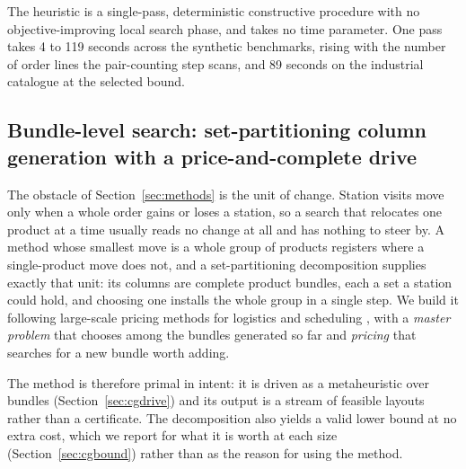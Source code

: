 \documentclass[]{interact}
\begin{document}
The heuristic is a single-pass, deterministic constructive procedure with no objective-improving local search phase, and takes no time parameter. One pass takes 4 to 119 seconds across the synthetic benchmarks, rising with the number of order lines the pair-counting step scans, and 89 seconds on the industrial catalogue at the selected bound.


\subsection{Bundle-level search: set-partitioning column generation with a price-and-complete drive}\label{sec:cg}
The obstacle of Section~\ref{sec:methods} is the unit of change. Station visits move only when a whole order gains or loses a station, so a search that relocates one product at a time usually reads no change at all and has nothing to steer by. A method whose smallest move is a whole group of products registers where a single-product move does not, and a set-partitioning decomposition supplies exactly that unit: its columns are complete product bundles, each a set a station could hold, and choosing one installs the whole group in a single step. We build it following large-scale pricing methods for logistics and scheduling \citep{lubbecke2005selected, desrochers1989column, muter2022}, with a \emph{master problem} that chooses among the bundles generated so far and \emph{pricing} that searches for a new bundle worth adding.

The method is therefore primal in intent: it is driven as a metaheuristic over bundles (Section~\ref{sec:cgdrive}) and its output is a stream of feasible layouts rather than a certificate. The decomposition also yields a valid lower bound at no extra cost, which we report for what it is worth at each size (Section~\ref{sec:cgbound}) rather than as the reason for using the method.
\end{document}
